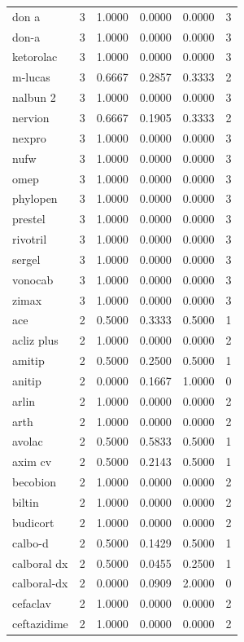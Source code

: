 \begin{longtable}{p{3.0cm}rrrrr}
don a & 3 & 1.0000 & 0.0000 & 0.0000 & 3 \\
don-a & 3 & 1.0000 & 0.0000 & 0.0000 & 3 \\
ketorolac & 3 & 1.0000 & 0.0000 & 0.0000 & 3 \\
m-lucas & 3 & 0.6667 & 0.2857 & 0.3333 & 2 \\
nalbun 2 & 3 & 1.0000 & 0.0000 & 0.0000 & 3 \\
nervion & 3 & 0.6667 & 0.1905 & 0.3333 & 2 \\
nexpro & 3 & 1.0000 & 0.0000 & 0.0000 & 3 \\
nufw & 3 & 1.0000 & 0.0000 & 0.0000 & 3 \\
omep & 3 & 1.0000 & 0.0000 & 0.0000 & 3 \\
phylopen & 3 & 1.0000 & 0.0000 & 0.0000 & 3 \\
prestel & 3 & 1.0000 & 0.0000 & 0.0000 & 3 \\
rivotril & 3 & 1.0000 & 0.0000 & 0.0000 & 3 \\
sergel & 3 & 1.0000 & 0.0000 & 0.0000 & 3 \\
vonocab & 3 & 1.0000 & 0.0000 & 0.0000 & 3 \\
zimax & 3 & 1.0000 & 0.0000 & 0.0000 & 3 \\
ace & 2 & 0.5000 & 0.3333 & 0.5000 & 1 \\
acliz plus & 2 & 1.0000 & 0.0000 & 0.0000 & 2 \\
amitip & 2 & 0.5000 & 0.2500 & 0.5000 & 1 \\
anitip & 2 & 0.0000 & 0.1667 & 1.0000 & 0 \\
arlin & 2 & 1.0000 & 0.0000 & 0.0000 & 2 \\
arth & 2 & 1.0000 & 0.0000 & 0.0000 & 2 \\
avolac & 2 & 0.5000 & 0.5833 & 0.5000 & 1 \\
axim cv & 2 & 0.5000 & 0.2143 & 0.5000 & 1 \\
becobion & 2 & 1.0000 & 0.0000 & 0.0000 & 2 \\
biltin & 2 & 1.0000 & 0.0000 & 0.0000 & 2 \\
budicort & 2 & 1.0000 & 0.0000 & 0.0000 & 2 \\
calbo-d & 2 & 0.5000 & 0.1429 & 0.5000 & 1 \\
calboral dx & 2 & 0.5000 & 0.0455 & 0.2500 & 1 \\
calboral-dx & 2 & 0.0000 & 0.0909 & 2.0000 & 0 \\
cefaclav & 2 & 1.0000 & 0.0000 & 0.0000 & 2 \\
ceftazidime & 2 & 1.0000 & 0.0000 & 0.0000 & 2 \\

\end{longtable}
